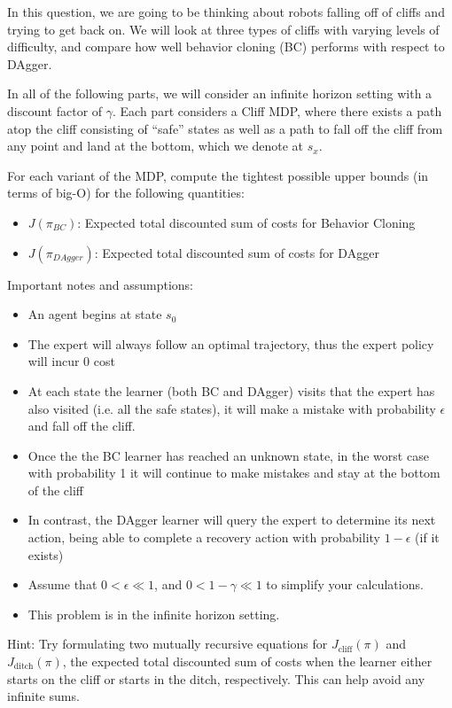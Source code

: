 \documentclass[11pt]{article}
\begin{document}
\newpage

\vskip 0.1in

\noindent In this question, we are going to be thinking about robots falling off of cliffs and trying to get back on. We will look at three types of cliffs with varying levels of difficulty, and compare how well behavior cloning (BC) performs with respect to DAgger. 

\noindent In all of the following parts, we will consider an infinite horizon setting with a discount factor of $\gamma$. Each part considers a Cliff MDP, where there exists a path atop the cliff consisting of ``safe'' states as well as a path to fall off the cliff from any point and land at the bottom, which we denote at $s_x$. 

For each variant of the MDP, compute the tightest possible upper bounds (in terms of big-O) for the following quantities:
\begin{itemize}
    \item $J(\pi_{BC})$: Expected total discounted sum of costs for Behavior Cloning
    \item $J(\pi_{DAgger})$: Expected total discounted sum of costs for DAgger
\end{itemize}
Important notes and assumptions:
\begin{itemize}
    \item An agent begins at state $s_0$
    \item The expert will always follow an optimal trajectory, thus the expert policy will incur 0 cost
    \item At each state the learner (both BC and DAgger) visits that the expert has also visited (i.e. all the safe states), it will make a mistake with probability $\epsilon$ and fall off the cliff.
    \item Once the the BC learner has reached an unknown state, in the worst case with probability 1 it will continue to make mistakes and stay at the bottom of the cliff
    \item In contrast, the DAgger learner will query the expert to determine its next action, being able to complete a recovery action with probability $1-\epsilon$ (if it exists)
    \item Assume that $0 < \epsilon \ll 1$, and $0 < 1 - \gamma \ll 1$ to simplify your calculations.
    \item This problem is in the infinite horizon setting.
\end{itemize}
{Hint: Try formulating two mutually recursive equations for $J_{\text{cliff}}(\pi)$ and $J_{\text{ditch}}(\pi)$, the expected total discounted sum of costs when the learner either starts on the cliff or starts in the ditch, respectively. This can help avoid any infinite sums.}
\end{document}
